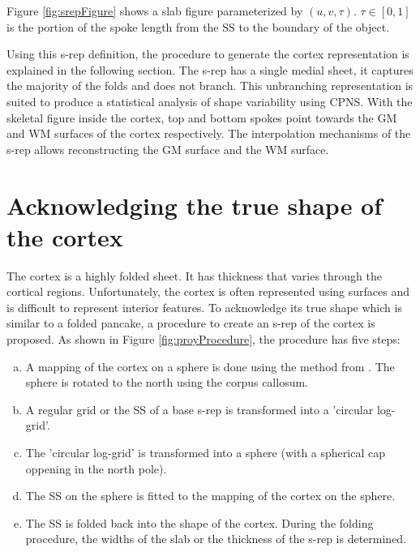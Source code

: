 \documentclass[a4paper,twoside]{article}
\begin{document}
Figure \ref{fig:srepFigure} shows a slab figure parameterized
by $(u, v, \tau)$. $\tau \in [0, 1]$ is the portion of the spoke length from the SS to the boundary of the object.

Using this s-rep definition, the procedure to generate the cortex representation is explained in the following section. 
The s-rep has a single medial sheet, it captures the  majority of the folds and does not branch. 
This unbranching representation is suited to produce a statistical analysis of shape variability using CPNS.
With the skeletal figure inside the cortex, 
top and bottom spokes point towards the GM and WM surfaces of the cortex respectively.
The interpolation mechanisms of the s-rep allows reconstructing the GM surface and the WM surface.

\section{Acknowledging the true shape of the cortex}
\label{sec:s-repFittingCortex}

\begin{figure*} 
 \centering 
 \caption[Flow diagram of s-rep projection and cortex folding.]{(a) Inflation of the cortex by \textit{Freesurfer} and rotation of the sphere to the north using the points in the corpus callosum. 
          (b) Transformation of a base s-rep into a circle.
          (c) Transformation of the circle into a sphere. 
          (d) Fitting the s-rep to \textit{Freesurfer's} data on the sphere.
          (e) Folding the SS of the s-rep inside the the cortex and determine the widths of the slab. 
          }
 \label{fig:proyProcedure}  
\end{figure*}

The cortex is a highly folded sheet. It has thickness that varies through the cortical regions. 
Unfortunately, the cortex is often represented using surfaces and is difficult to 
represent interior  features.
To acknowledge its true shape which is similar to a folded pancake, 
a procedure to create an s-rep of the cortex is proposed. 
As shown in Figure \ref{fig:proyProcedure}, the procedure has five steps:

\begin{enumerate}[(a)]
 \item A mapping of the cortex on a sphere is done using the method from \cite{fischl_cortical_1999}. The sphere is rotated to the north using the corpus callosum.
 \item A regular grid or the SS of a base s-rep is transformed into a 'circular log-grid'.
 \item The 'circular log-grid' is transformed into a sphere (with a spherical cap oppening in the north pole).
 \item The SS on the sphere is fitted to the mapping of the cortex on the sphere.
 \item The SS is folded back into the shape of the cortex. During the folding procedure, the widths of the slab or the thickness of the s-rep is determined.        
\end{enumerate}
\end{document}
